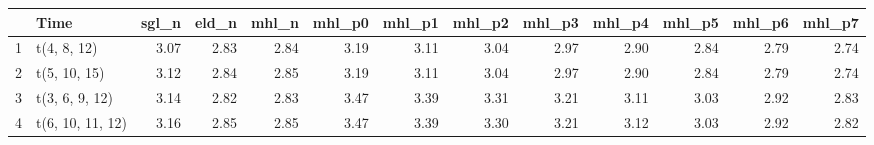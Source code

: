 \begin{table}[ht]
\centering
\begin{tabular}{rlrrrrrrrrrrr}
  \hline
 & Time & sgl\_n & eld\_n & mhl\_n & mhl\_p0 & mhl\_p1 & mhl\_p2 & mhl\_p3 & mhl\_p4 & mhl\_p5 & mhl\_p6 & mhl\_p7 \\ 
  \hline
1 & t(4, 8, 12) & 3.07 & 2.83 & 2.84 & 3.19 & 3.11 & 3.04 & 2.97 & 2.90 & 2.84 & 2.79 & 2.74 \\ 
  2 & t(5, 10, 15) & 3.12 & 2.84 & 2.85 & 3.19 & 3.11 & 3.04 & 2.97 & 2.90 & 2.84 & 2.79 & 2.74 \\ 
  3 & t(3, 6, 9, 12) & 3.14 & 2.82 & 2.83 & 3.47 & 3.39 & 3.31 & 3.21 & 3.11 & 3.03 & 2.92 & 2.83 \\ 
  4 & t(6, 10, 11, 12) & 3.16 & 2.85 & 2.85 & 3.47 & 3.39 & 3.30 & 3.21 & 3.12 & 3.03 & 2.92 & 2.82 \\ 
   \hline
\end{tabular}
\end{table}
